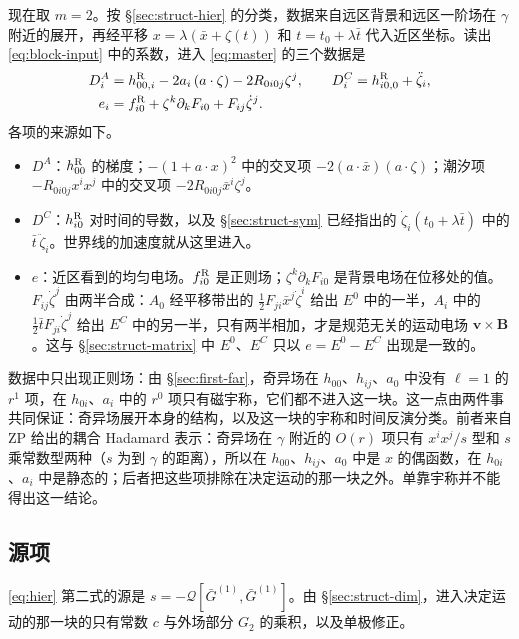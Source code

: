 \documentclass[11pt,a4paper]{ctexart}
\begin{document}
现在取 $m=2$。按 \S\ref{sec:struct-hier} 的分类，数据来自远区背景和远区一阶场在 $\gamma$ 附近的展开，再经平移 $x=\lambda(\bar x+\zeta(t))$ 和 $t=t_0+\lambda\bar t$ 代入近区坐标。读出 \eqref{eq:block-input} 中的系数，进入 \eqref{eq:master} 的三个数据是
\begin{align}
D^A_i&=h^{\rm R}_{00,i}-2a_i\,(a\cdot\zeta)-2R_{0i0j}\zeta^j,\qquad D^C_i=h^{\rm R}_{i0,0}+\ddot\zeta_i,\label{eq:DAC}\\
e_i&=f^{\rm R}_{i0}+\zeta^k\partial_kF_{i0}+F_{ij}\dot\zeta^j .\label{eq:e2}
\end{align}
各项的来源如下。
\begin{itemize}[nosep]
\item $D^A$：$h^{\rm R}_{00}$ 的梯度；$-(1+a\cdot x)^2$ 中的交叉项 $-2(a\cdot\bar x)(a\cdot\zeta)$；潮汐项 $-R_{0i0j}x^ix^j$ 中的交叉项 $-2R_{0i0j}\bar x^i\zeta^j$。
\item $D^C$：$h^{\rm R}_{i0}$ 对时间的导数，以及 \S\ref{sec:struct-sym} 已经指出的 $\dot\zeta_i(t_0+\lambda\bar t)$ 中的 $\bar t\,\ddot\zeta_i$。世界线的加速度就从这里进入。
\item $e$：近区看到的均匀电场。$f^{\rm R}_{i0}$ 是正则场；$\zeta^k\partial_kF_{i0}$ 是背景电场在位移处的值。$F_{ij}\dot\zeta^j$ 由两半合成：$A_0$ 经平移带出的 $\tfrac12F_{ji}\bar x^j\dot\zeta^i$ 给出 $E^0$ 中的一半，$A_i$ 中的 $\tfrac12\bar tF_{ji}\dot\zeta^j$ 给出 $E^C$ 中的另一半，只有两半相加，才是规范无关的运动电场 $\boldsymbol v\times\boldsymbol B$。这与 \S\ref{sec:struct-matrix} 中 $E^0$、$E^C$ 只以 $e=E^0-E^C$ 出现是一致的。
\end{itemize}
数据中只出现正则场：由 \S\ref{sec:first-far}，奇异场在 $h_{00}$、$h_{ij}$、$a_0$ 中没有 $\ell=1$ 的 $r^1$ 项，在 $h_{0i}$、$a_i$ 中的 $r^0$ 项只有磁宇称，它们都不进入这一块。这一点由两件事共同保证：奇异场展开本身的结构，以及这一块的宇称和时间反演分类。前者来自 ZP 给出的耦合 Hadamard 表示：奇异场在 $\gamma$ 附近的 $O(r)$ 项只有 $x^ix^j/s$ 型和 $s$ 乘常数型两种（$s$ 为到 $\gamma$ 的距离），所以在 $h_{00}$、$h_{ij}$、$a_0$ 中是 $x$ 的偶函数，在 $h_{0i}$、$a_i$ 中是静态的；后者把这些项排除在决定运动的那一块之外。单靠宇称并不能得出这一结论。

\subsection{源项}\label{sec:first-source}

\eqref{eq:hier} 第二式的源是 $s=-\mathcal Q[\bar G^{(1)},\bar G^{(1)}]$。由 \S\ref{sec:struct-dim}，进入决定运动的那一块的只有常数 $c$ 与外场部分 $G_2$ 的乘积，以及单极修正。
\end{document}
